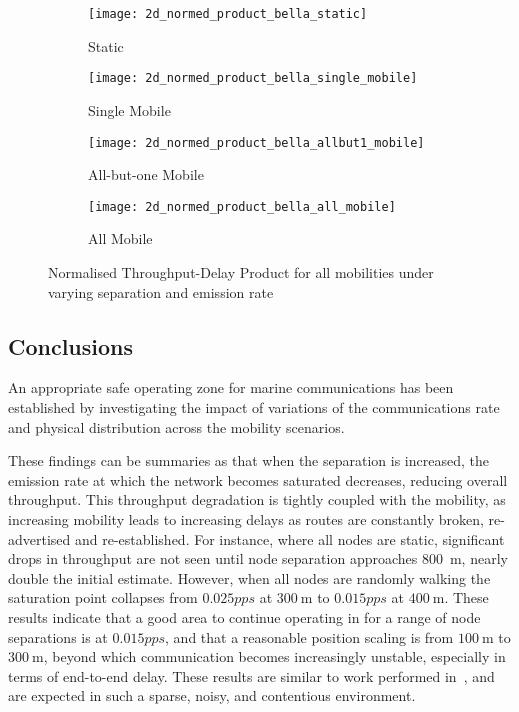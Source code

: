 

\begin{figure}[h]
  \begin{subfigure}[t]{0.5\textwidth}
    \centering
    \texttt{[image: 2d\_normed\_product\_bella\_static]}
    \caption{Static}
    \label{fig:2d_normed_product_bella_static}
  \end{subfigure}
  \begin{subfigure}[t]{0.5\textwidth}
    \centering
    \texttt{[image: 2d\_normed\_product\_bella\_single\_mobile]}
    \caption{Single Mobile}
    \label{fig:2d_normed_product_bella_single_mobile}
  \end{subfigure}
  
  \begin{subfigure}[t]{0.5\textwidth}
    \centering
    \texttt{[image: 2d\_normed\_product\_bella\_allbut1\_mobile]}
    \caption{All-but-one Mobile}
    \label{fig:2d_normed_product_bella_allbut1_mobile}
  \end{subfigure}
  \begin{subfigure}[t]{0.5\textwidth}
    \centering
    \texttt{[image: 2d\_normed\_product\_bella\_all\_mobile]}
    \caption{All Mobile}
    \label{fig:2d_normed_product_bella_all_mobile}
  \end{subfigure}
  \caption{Normalised Throughput-Delay Product for all mobilities under varying separation and emission rate}
  \label{fig:2d_normed_product}
\end{figure}


\subsection{Conclusions}

An appropriate safe operating zone for marine communications has been established by investigating the impact of variations of the communications rate and physical distribution across the mobility scenarios.

These findings can be summaries as that when the separation is increased, the emission rate at which the network becomes saturated decreases, reducing overall throughput. 
This throughput degradation is tightly coupled with the mobility, as increasing mobility leads to increasing delays as routes are constantly broken, re-advertised and re-established. 
For instance, where all nodes are static, significant drops in throughput are not seen until node separation approaches \SI{800}{\meter}, nearly double the initial estimate. 
However, when all nodes are randomly walking the saturation point collapses from $0.025pps$ at $\SI{300}{\meter}$ to $0.015pps$ at $\SI{400}{\meter}$.
These results indicate that a good area to continue operating in for a range of node separations is at $0.015pps$, and that a reasonable position scaling is from $\SI{100}{\meter}$ to $\SI{300}{\meter}$, beyond which communication becomes increasingly unstable, especially in terms of end-to-end delay.
These results are similar to work performed in~\cite{Miquel2008}, and are expected in such a sparse, noisy, and contentious environment. 

